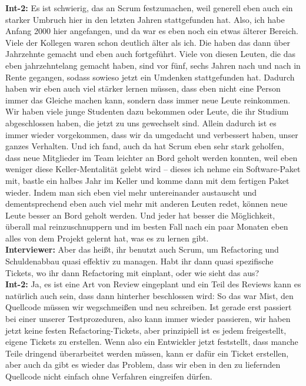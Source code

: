 \textbf{Int-2:} Es ist schwierig, das an Scrum festzumachen, weil generell eben auch ein starker Umbruch hier in den letzten Jahren stattgefunden hat. Also, ich habe Anfang 2000 hier angefangen, und da war es eben noch ein etwas älterer Bereich. Viele der Kollegen waren schon deutlich älter als ich. Die haben das dann über Jahrzehnte gemacht und eben auch fortgeführt. Viele von diesen Leuten, die das eben jahrzehntelang gemacht haben, sind vor fünf, sechs Jahren nach und nach in Rente gegangen, sodass sowieso jetzt ein Umdenken stattgefunden hat. Dadurch haben wir eben auch viel stärker lernen müssen, dass eben nicht eine Person immer das Gleiche machen kann, sondern dass immer neue Leute reinkommen. Wir haben viele junge Studenten dazu bekommen oder Leute, die ihr Studium abgeschlossen haben, die jetzt zu uns gewechselt sind. Allein dadurch ist es immer wieder vorgekommen, dass wir da umgedacht und verbessert haben, unser ganzes Verhalten. Und ich fand, auch da hat Scrum eben sehr stark geholfen, dass neue Mitglieder im Team leichter an Bord geholt werden konnten, weil eben weniger diese Keller-Mentalität gelebt wird – dieses ich nehme ein Software-Paket mit, bastle ein halbes Jahr im Keller und komme dann mit dem fertigen Paket wieder. Indem man sich eben viel mehr untereinander austauscht und dementsprechend eben auch viel mehr mit anderen Leuten redet, können neue Leute besser an Bord geholt werden. Und jeder hat besser die Möglichkeit, überall mal reinzuschnuppern und im besten Fall nach ein paar Monaten eben alles von dem Projekt gelernt hat, was es zu lernen gibt. \\
\textbf{Interviewer:} Aber das heißt, ihr benutzt auch Scrum, um Refactoring und Schuldenabbau quasi effektiv zu managen. Habt ihr dann quasi spezifische Tickets, wo ihr dann Refactoring mit einplant, oder wie sieht das aus?\\
\textbf{Int-2:} Ja, es ist eine Art von Review eingeplant und ein Teil des Reviews kann es natürlich auch sein, dass dann hinterher beschlossen wird: So das war Mist, den Quellcode müssen wir wegschmeißen und neu schreiben. Ist gerade erst passiert bei einer unserer Testprozeduren, also kann immer wieder passieren, wir haben jetzt keine festen Refactoring-Tickets, aber prinzipiell ist es jedem freigestellt, eigene Tickets zu erstellen. Wenn also ein Entwickler jetzt feststellt, dass manche Teile dringend überarbeitet werden müssen, kann er dafür ein Ticket erstellen, aber auch da gibt es wieder das Problem, dass wir eben in den zu liefernden Quellcode nicht einfach ohne Verfahren eingreifen dürfen. \\
